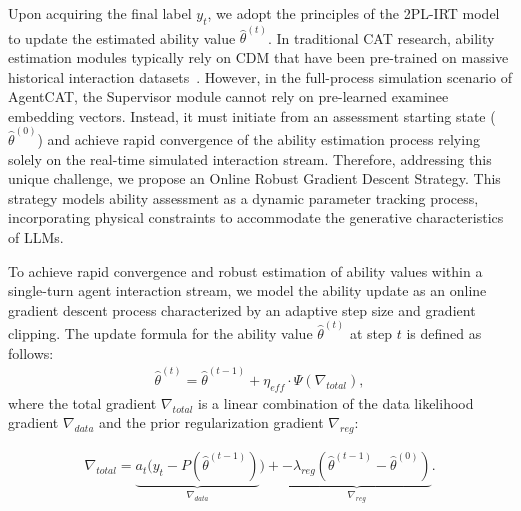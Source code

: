 Upon acquiring the final label $y_t$, we adopt the principles of the 2PL-IRT model to update the estimated ability value $\hat{\theta}^{(t)}$. In traditional CAT research, ability estimation modules typically rely on CDM that have been pre-trained on massive historical interaction datasets~\cite{zhuang2026survey, ma2025diffusion,wang2025explicit}. However, in the full-process simulation scenario of AgentCAT, the Supervisor module cannot rely on pre-learned examinee embedding vectors. Instead, it must initiate from an assessment starting state ($\hat{\theta}^{(0)}$) and achieve rapid convergence of the ability estimation process relying solely on the real-time simulated interaction stream. Therefore, addressing this unique challenge, we propose an Online Robust Gradient Descent Strategy. This strategy models ability assessment as a dynamic parameter tracking process, incorporating physical constraints to accommodate the generative characteristics of LLMs.


To achieve rapid convergence and robust estimation of ability values within a single-turn agent interaction stream, we model the ability update as an online gradient descent process characterized by an adaptive step size and gradient clipping. The update formula for the ability value $\hat{\theta}^{(t)}$ at step $t$ is defined as follows:
\begin{align}
    \hat{\theta}^{(t)} = \hat{\theta}^{(t-1)} + \eta_{eff} \cdot \Psi(\nabla_{total}),
\end{align}
where the total gradient $\nabla_{total}$ is a linear combination of the data likelihood gradient $\nabla_{data}$ and the prior regularization gradient $\nabla_{reg}$:

\begin{align}
    \nabla_{total} = \underbrace{a_t (y_t -P(\hat{\theta}^{(t-1)})}_{\nabla_{data}}) + \underbrace{-\lambda_{reg} (\hat{\theta}^{(t-1)} - \hat{\theta}^{(0)})}_{\nabla_{reg}}.
\end{align}

